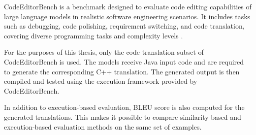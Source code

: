 CodeEditorBench is a benchmark designed to evaluate code editing capabilities of
large language models in realistic software engineering scenarios. It includes
tasks such as debugging, code polishing, requirement switching, and code
translation, covering diverse programming tasks and complexity levels
\cite{codeeditorbench}.

For the purposes of this thesis, only the code translation subset of
CodeEditorBench is used. The models receive Java input code and are required to
generate the corresponding C++ translation. The generated output is then
compiled and tested using the execution framework provided by CodeEditorBench.

In addition to execution-based evaluation, BLEU score is also computed for the
generated translations. This makes it possible to compare similarity-based and
execution-based evaluation methods on the same set of examples.